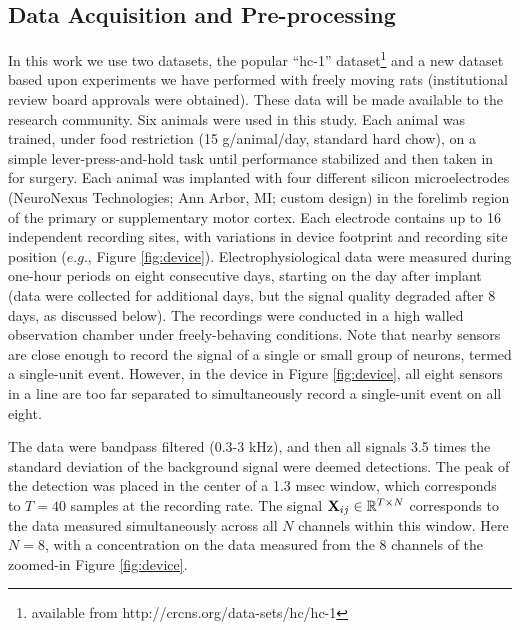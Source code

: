 \documentclass[journal]{IEEEtran}
\newcommand{\jovo}[1]{{\color{magenta}{ #1}}}
\begin{document}
\subsection{Data Acquisition and Pre-processing} %
\label{sub:data_acquisition_and_pre_processing}


In this work we use two datasets, the popular ``hc-1'' dataset\footnote{available from http://crcns.org/data-sets/hc/hc-1} and a new dataset based upon experiments we have performed with freely moving rats (institutional review board approvals were obtained). These data will be made available to the research community.  Six animals were used in this study. Each animal was trained, under food restriction (15 g/animal/day, standard hard chow), on a simple lever-press-and-hold task until performance stabilized and then taken in for surgery.  Each animal was implanted with four different silicon microelectrodes  (NeuroNexus Technologies; Ann Arbor, MI; custom design) in the forelimb region of the primary or supplementary motor cortex. Each electrode contains up to 16 independent recording sites, with variations in device footprint and recording site position ($e.g.$, Figure \ref{fig:device}).  Electrophysiological data were measured during one-hour periods on eight consecutive days, starting on the day after implant (data were collected for additional days, but the signal quality degraded after 8 days, as discussed below).  The recordings were conducted in a high walled observation chamber under freely-behaving conditions.  Note that nearby sensors are close enough to record the signal of a single or small group of neurons, termed a single-unit event. However, in the device in Figure \ref{fig:device}, all eight sensors in a line are too far separated to simultaneously record a single-unit event on all eight.

The data were bandpass filtered (0.3-3 kHz), and
then all signals 3.5 times the standard deviation of the background
signal were deemed detections. The peak of the detection was placed
in the center of a 1.3 msec window, which corresponds to $T=40$
samples at the recording rate. The signal
${\mathbf X}_{ij}\in\mathbb{R}^{T\times N}$ corresponds to the data
measured simultaneously across all $N$ channels within this window.
Here $N=8$, with a concentration on the data measured from the 8
channels of the zoomed-in Figure \ref{fig:device}.%


\end{document}
